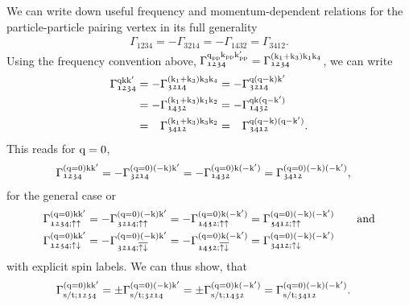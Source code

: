 \documentclass[main.tex]{subfiles}
\begin{document}
We can write down useful frequency and momentum-dependent relations for the particle-particle pairing vertex in its full generality \cite{rohringer thesis}
\begin{align}
	\Gamma_{\mathfrak{1234}}=-\Gamma_{\mathfrak{3214}}=-\Gamma_{\mathfrak{1432}}=\Gamma_{\mathfrak{3412}}.
\end{align}
Using the frequency convention above, $\Gamma^{\text{q}_{\text{pp}}\text{k}_{\text{pp}}\text{k}'_{\text{pp}}}_{\mathfrak{1234}}=\Gamma^{(\text{k}_1+\text{k}_3)\text{k}_1\text{k}_4}_{\mathfrak{1234}}$, we can write
\begin{subequations}
\begin{align}
	\Gamma_{\mathfrak{1234}}^{\text{q}\text{k}\text{k}'}&=-\Gamma_{\mathfrak{3214}}^{(\text{k}_1+\text{k}_3)\text{k}_3\text{k}_4}=-\Gamma_{\mathfrak{3214}}^{\text{q}(\text{q}-\text{k})\text{k}'}\\
	&=-\Gamma_{\mathfrak{1432}}^{(\text{k}_1+\text{k}_3)\text{k}_1\text{k}_2}=-\Gamma_{\mathfrak{1432}}^{\text{q}\text{k}(\text{q}-\text{k}')}\\
	&=\phantom{-}\Gamma_{\mathfrak{3412}}^{(\text{k}_1+\text{k}_3)\text{k}_3\text{k}_2}=\phantom{-}\Gamma_{\mathfrak{3412}}^{\text{q}(\text{q}-\text{k})(\text{q}-\text{k}')}.
\end{align}
\end{subequations}
This reads for $\text{q}=0$,
\begin{align}
	\Gamma_{\mathfrak{1234}}^{(\text{q}=0)\text{k}\text{k}'}&=-\Gamma_{\mathfrak{3214}}^{(\text{q}=0)(-\text{k})\text{k}'}=-\Gamma_{\mathfrak{1432}}^{(\text{q}=0)\text{k}(-\text{k}')}=\Gamma_{\mathfrak{3412}}^{(\text{q}=0)(-\text{k})(-\text{k}')},
\end{align}
for the general case or
\begin{subequations}\label{eq:frequency_relations_vertex_pp_spins}
\begin{align}
	\Gamma_{\mathfrak{1234};\uparrow\uparrow}^{(\text{q}=0)\text{k}\text{k}'}&=-\Gamma_{\mathfrak{3214};\uparrow\uparrow}^{(\text{q}=0)(-\text{k})\text{k}'}=-\Gamma_{\mathfrak{1432};\uparrow\uparrow}^{(\text{q}=0)\text{k}(-\text{k}')}=\Gamma_{\mathfrak{3412};\uparrow\uparrow}^{(\text{q}=0)(-\text{k})(-\text{k}')}\qquad\text{and}\\
	\Gamma_{\mathfrak{1234};\uparrow\downarrow}^{(\text{q}=0)\text{k}\text{k}'}&=-\Gamma_{\mathfrak{3214};\overline{\uparrow\downarrow}}^{(\text{q}=0)(-\text{k})\text{k}'}=-\Gamma_{\mathfrak{1432};\overline{\uparrow\downarrow}}^{(\text{q}=0)\text{k}(-\text{k}')}=\Gamma_{\mathfrak{3412};\uparrow\downarrow}^{(\text{q}=0)(-\text{k})(-\text{k}')}
\end{align}
\end{subequations}
with explicit spin labels. We can thus show, that
\begin{align}\label{eq:frequency_relations_vertex_pp_sing_trip}
	\Gamma_{\text{s}/\text{t};\mathfrak{1234}}^{(\text{q}=0)\text{k}\text{k}'}&=\pm\Gamma_{\text{s}/\text{t};\mathfrak{3214}}^{(\text{q}=0)(-\text{k})\text{k}'}=\pm\Gamma_{\text{s}/\text{t};\mathfrak{1432}}^{(\text{q}=0)\text{k}(-\text{k}')}=\Gamma_{\text{s}/\text{t};\mathfrak{3412}}^{(\text{q}=0)(-\text{k})(-\text{k}')}.
\end{align}
\end{document}
